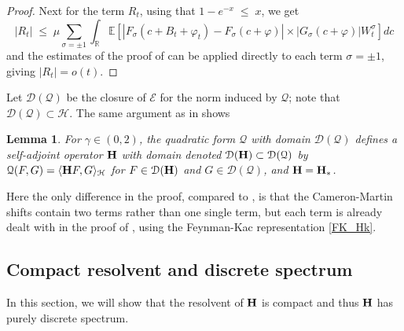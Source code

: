 \documentclass[11pt]{amsart}
\numberwithin{equation}{section}
\newtheorem{lemma}[theorem]{Lemma}
\theoremstyle{definition}
\renewcommand{\leq}{\;\leqslant\;}                   %
\newcommand{\R}{\mathbb{R}}
\newcommand{\cjd}{\rangle}
\newcommand{\cjg}{\langle}
\def\E{\mathbb{E}}
\newcommand{\mc}{\mathcal}
\begin{document}
\begin{proof}
Next for the term $R_t$, using that $1-e^{-x}\leq x$, we get 
\[ |R_t| \leq \mu \sum_{\sigma=\pm 1}\int_\R \E[ |F_\sigma(c+B_t+\varphi_t)-F_\sigma(c+\varphi)|\times |G_\sigma(c+\varphi)|W_t^{\sigma}]dc\]
and  the estimates of the proof of \cite[Lemma 5.4]{GKRV} can be applied directly to each term $\sigma = \pm 1$, giving $|R_t|=o(t)$. 
\end{proof}

Let $\mc{D}(\mc{Q})$ be the closure of $\mc{E}$ for the norm induced by $\mc{Q}$; note that $\mc{D}(\mc{Q})\subset \mc{H}$. The same argument as in \cite[Proposition 5.5.]{GKRV} shows 
\begin{lemma}\label{lem:Q_equal_Qstar}
For $\gamma\in (0,2)$, the quadratic form $\mc{Q}$ with domain $\mc{D}(\mc{Q})$ defines a self-adjoint operator ${\bf H}$ with domain denoted $\mc{D}({\bf H})\subset \mc{D}(\mc{Q})$ by $\mc{Q}(F,G)=\cjg {\bf H}F,G\cjd_{\mc{H}}$ for $F\in \mc{D}({\bf H})$ and $G\in \mc{D}(\mc{Q})$, and ${\bf H}={\bf H}_*$.
\end{lemma}
Here the only difference in the proof, compared to  \cite[Proposition 5.5.]{GKRV}, is that the Cameron-Martin shifts contain two terms rather than one single term, but each term is already dealt with in  the proof of 
\cite[Proposition 5.5.]{GKRV}, using the Feynman-Kac representation \eqref{FK_Hk}.

\subsection{Compact resolvent and discrete spectrum}
In this section, we will show that the resolvent of ${\bf H}$ is compact and thus ${\bf H}$ has purely discrete spectrum. 
\end{document}
